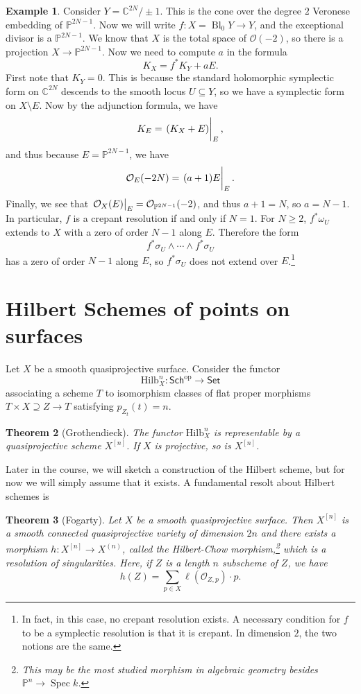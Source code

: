 \documentclass[leqno, openany]{memoir}
\newtheorem{thm}{Theorem}[section]
\theoremstyle{definition}
\newtheorem{exm}[thm]{Example}
\theoremstyle{remark}
\theoremstyle{plain}
\theoremstyle{definition}
\theoremstyle{remark}
\newcommand{\C}{\mathbb{C}}
\renewcommand{\P}{\mathbb{P}}
\newcommand{\mc}[1]{\mathcal{#1}}
\newcommand{\mr}[1]{\mathrm{#1}}
\newcommand{\ms}[1]{\mathsf{#1}}
\DeclareMathOperator{\Spec}{Spec}
\DeclareMathOperator{\Bl}{Bl}
\begin{document}
\begin{exm}
    Consider $Y = \C^{2N}/\pm 1$. This is the cone over the degree $2$ Veronese embedding of $\P^{2N-1}$. Now we will write $f \colon X = \Bl_0 Y \to Y$, and the exceptional divisor is a $\P^{2N-1}$. We know that $X$ is the total space of $\mc{O}(-2)$, so there is a projection $X \to \P^{2N-1}$. Now we need to compute $a$ in the formula
    \[ K_X = f^* K_Y + aE. \]
    First note that $K_Y = 0$. This is because the standard holomorphic symplectic form on $\C^{2N}$ descends to the smooth locus $U \subseteq Y$, so we have a symplectic form on $X \setminus E$. Now by the adjunction formula, we have
    \[ K_E = \eval{(K_X+E)}_E, \]
    and thus because $E = \P^{2N-1}$, we have
    \[ \mc{O}_E(-2N) = \eval{(a+1)E}_E. \]
    Finally, we see that $\eval{\mc{O}_X(E)}_E = \mc{O}_{\P^{2N-1}}(-2)$, and thus $a+1 = N$, so $a = N-1$. In particular, $f$ is a crepant resolution if and only if $N = 1$. For $N \geq 2$, $f^* \omega_U$ extends to $X$ with a zero of order $N-1$ along $E$. Therefore the form
    \[ f^* \sigma_U \wedge \cdots \wedge f^* \sigma_U \]
    has a zero of order $N-1$ along $E$, so $f^* \sigma_U$ does not extend over $E$.\footnote{In fact, in this case, no crepant resolution exists. A necessary condition for $f$ to be a symplectic resolution is that it is crepant. In dimension $2$, the two notions are the same.}
\end{exm}

\section{Hilbert Schemes of points on surfaces}%
\label{sec:hilbert_schemes_of_points_on_surfaces}

Let $X$ be a smooth quasiprojective surface. Consider the functor
\[ \mr{Hilb}_X^n \colon \ms{Sch}^{\mr{op}} \to \ms{Set} \]
associating a scheme $T$ to isomorphism classes of flat proper morphisms $T \times X \supseteq Z \to T$ satisfying $p_{Z_t}(t) = n$.

\begin{thm}[Grothendieck]
    The functor $\mr{Hilb}_X^n$ is representable by a quasiprojective scheme $X^{[n]}$. If $X$ is projective, so is $X^{[n]}$.
\end{thm}

Later in the course, we will sketch a construction of the Hilbert scheme, but for now we will simply assume that it exists. A fundamental resolt about Hilbert schemes is
\begin{thm}[Fogarty]
    Let $X$ be a smooth quasiprojective surface. Then $X^{[n]}$ is a smooth connected quasiprojective variety of dimension $2n$ and there exists a morphism $h \colon X^{[n]} \to X^{(n)}$, called the \textit{Hilbert-Chow morphism},\footnote{This may be the most studied morphism in algebraic geometry besides $\P^n \to \Spec k$.} which is a resolution of singularities. Here, if $Z$ is a length $n$ subscheme of $Z$, we have
    \[ h(Z) = \sum_{p \in X} \ell(\mc{O}_{Z,p}) \cdot p. \]
\end{thm}
\end{document}
